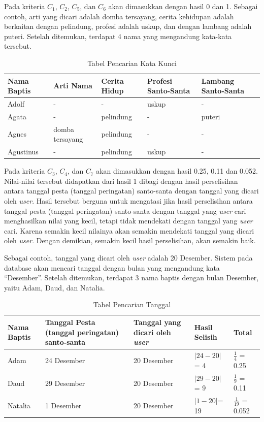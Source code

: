 Pada kriteria $C_{1}$, $C_{2}$, $C_{5}$, dan $C_{6}$ akan dimasukkan dengan hasil 0 dan 1. Sebagai contoh, arti yang dicari adalah domba tersayang, cerita kehidupan adalah berkaitan dengan pelindung, profesi adalah uskup, dan dengan lambang adalah puteri. Setelah ditemukan, terdapat 4 nama yang mengandung kata-kata tersebut.


\begin{table}[H]
	\centering
	\caption{Tabel Pencarian Kata Kunci}
		\begin{tabular}{| l | l | l| l | l |} \hline
    Nama Baptis & Arti Nama & Cerita Hidup & Profesi Santo-Santa & Lambang Santo-Santa \\ \hline
  Adolf & - & - & uskup & - \\ \hline 
	Agata & - & pelindung & - & puteri \\ \hline
	Agnes & domba tersayang & pelindung & - & - \\ \hline
	Agustinus & - & pelindung & uskup & - \\ 
    \hline
				\end{tabular}
	\label{table:pencariankk}
\end{table}

 

Pada kriteria $C_{3}$, $C_{4}$, dan $C_{7}$ akan dimasukkan dengan hasil 0.25, 0.11 dan 0.052. Nilai-nilai tersebut didapatkan dari hasil 1 dibagi dengan hasil perselisihan antara tanggal pesta (tanggal peringatan) santo-santa dengan tanggal yang dicari oleh \textit{user}. Hasil tersebut berguna untuk mengatasi jika hasil perselisihan antara tanggal pesta (tanggal peringatan) santo-santa dengan tanggal yang \textit{user} cari menghasilkan nilai yang kecil, tetapi tidak mendekati dengan tanggal yang \textit{user} cari. Karena semakin kecil nilainya akan semakin mendekati tanggal yang dicari oleh \textit{user}. Dengan demikian, semakin kecil hasil perselisihan, akan semakin baik. 

Sebagai contoh, tanggal yang dicari oleh \textit{user} adalah 20 Desember. Sistem pada database akan mencari tanggal dengan bulan yang mengandung kata ``Desember''. Setelah ditemukan, terdapat 3 nama baptis dengan bulan Desember, yaitu Adam, Daud, dan Natalia.


\begin{table}[H]
	\centering
	\caption{Tabel Pencarian Tanggal}
		\begin{tabular}{| l | p{3cm} | p{3cm}| l | l |} \hline
   Nama Baptis & Tanggal Pesta (tanggal peringatan) santo-santa & Tanggal yang dicari oleh \textit{user} & Hasil Selisih &  Total\\ \hline
  Adam & 24 Desember & 20 Desember & $|24 - 20 | $= 4 & $\frac{1}{4}$ = 0.25\\ \hline 
	Daud & 29 Desember & 20 Desember & $|29 - 20 |$ = 9 & $\frac{1}{9}$ = 0.11\\ \hline
	Natalia & 1 Desember & 20 Desember & $|1 - 20 | $= 19 & $\frac{1}{19}$ = 0.052\\ 
    \hline
				\end{tabular}
	\label{table:pencariantgl}
\end{table}

